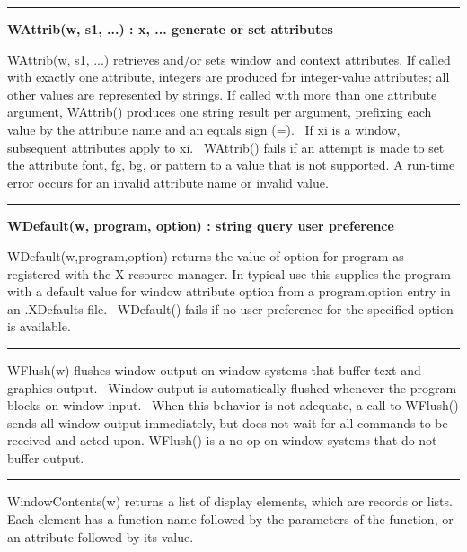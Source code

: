\bigskip\hrule\vspace{0.1cm}
\noindent
{\bf WAttrib(w, s1, ...) : x, ... \hfill generate or set attributes}

\noindent
\textsf{WAttrib(w, s1, ...)} retrieves and/or sets window and context
attributes. If called with exactly one attribute, integers are produced
for integer-value attributes; all other values are represented by
strings. If called with more than one attribute argument,
\textsf{WAttrib()} produces one string result per argument, prefixing
each value by the attribute name and an equals sign (=). \ If
\textsf{xi} is a window, subsequent attributes apply to \textsf{xi}.
\ \textsf{WAttrib()} fails if an attempt is made to set the attribute
\textsf{font}, \textsf{fg}, \textsf{bg}, or \textsf{pattern} to a value
that is not supported. A run-time error occurs for an invalid attribute
name or invalid value.

\bigskip\hrule\vspace{0.1cm}
\noindent
{\bf WDefault(w, program, option) : string \hfill query user preference}

\noindent
\textsf{WDefault(w,program,option)} returns the value of option for
program as registered with the X resource manager. In typical use this
supplies the program with a default value for window attribute option
from a program.option entry in an .XDefaults file.
\ \textsf{WDefault()} fails if no user preference for the specified
option is available.

\bigskip\hrule\vspace{0.1cm}

\noindent
\textsf{WFlush(w)} flushes window output on window systems that buffer
text and graphics output. \ Window output is automatically flushed
whenever the program blocks on window input. \ When this behavior is
not adequate, a call to \textsf{WFlush()} sends all window output
immediately, but does not wait for all commands to be received and
acted upon. \textsf{WFlush()} is a no-op on window systems that do not
buffer output.

\bigskip\hrule\vspace{0.1cm}

\noindent
\textsf{WindowContents(w)} returns a list of display elements, which are
records or lists. Each element has a function name followed by the
parameters of the function, or an attribute followed by its value.

